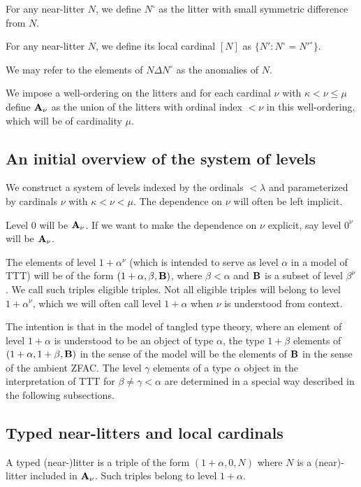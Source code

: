 \documentclass[12pt]{article}
\begin{document}
For any near-litter $N$, we define $N^\circ$ as the litter with small symmetric difference from $N$.

For any near-litter $N$, we define its local cardinal $[N]$ as $\{N':N^{\circ} = N'^{\circ}\}$.

We may refer to the elements of $N \Delta N^{\circ}$ as the anomalies of $N$.

We impose a well-ordering on the litters and for each cardinal $\nu$ with $\kappa<\nu \leq \mu$  define ${\bf A}_\nu$ as the union of the litters with ordinal index $<\nu$ in this well-ordering, which will be of cardinality $\mu$.


\subsection{An initial overview of the system of levels}

We construct a system of levels indexed by the ordinals $<\lambda$ and parameterized by cardinals $\nu$ with $\kappa<\nu<\mu$.  The dependence on $\nu$ will often be left implicit.

Level 0 will be ${\bf A}_\nu$.  If we want to make the dependence on $\nu$ explicit, say level $0^{\nu}$ will be ${\bf A}_\nu$. 

The elements of level $1+\alpha^{\nu}$ (which is intended to serve as level $\alpha$ in a model of TTT) will be of the form $(1+\alpha,\beta,{\bf B})$, where $\beta<\alpha$
and ${\bf B}$ is a subset of level $\beta^{\nu}$.  We call such triples eligible triples.  Not all eligible triples will belong to level $1+\alpha^{\nu}$, which we will often call level $1+\alpha$ when $\nu$ is understood from context.

The intention is that in the model of tangled type theory, where an element of level $1+\alpha$ is understood to be an object of type $\alpha$, the type $1+\beta$ elements of
$(1+\alpha,1+\beta,{\bf B})$ in the sense of the model will be the elements of ${\bf B}$ in the sense of the ambient ZFAC.  The level $\gamma$ elements of a type $\alpha$ object in the interpretation of TTT for $\beta \neq \gamma <\alpha$ are determined in a special way described in the following subsections.



\subsection{Typed near-litters and local cardinals}

A typed (near-)litter is a triple of the form $(1+\alpha,0,N)$ where $N$ is a (near)-litter included in ${\bf A}_\nu$.  Such triples belong to level $1+\alpha$.
\end{document}
